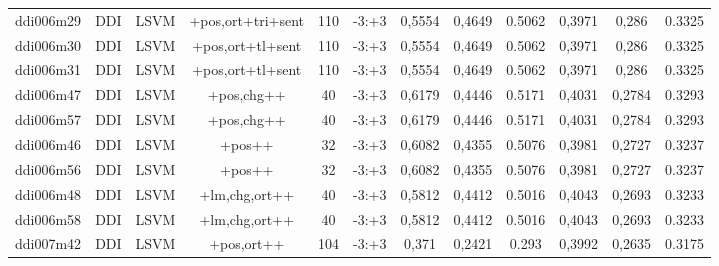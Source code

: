 \documentclass[a4paper]{article}
\begin{document}
\begin{landscape}
\begin{center}
\begin{tabular}{ |c|c|c|c|c|c|c|c|c|c|c|c|}
 
 	
 	\small{ ddi006m29 } & \small{ DDI} & \small{  LSVM }  & +pos,ort+tri+sent  &  110 &  \small{  -3:+3 }  &  0,5554 & 0,4649 & 0.5062  &  0,3971 & 0,286 & 0.3325 \\
 	

 
 	
 	\small{ ddi006m30 } & \small{ DDI} & \small{  LSVM }  & +pos,ort+tl+sent  &  110 &  \small{  -3:+3 }  &  0,5554 & 0,4649 & 0.5062  &  0,3971 & 0,286 & 0.3325 \\
 	

 
 	
 	\small{ ddi006m31 } & \small{ DDI} & \small{  LSVM }  & +pos,ort+tl+sent  &  110 &  \small{  -3:+3 }  &  0,5554 & 0,4649 & 0.5062  &  0,3971 & 0,286 & 0.3325 \\
 	

 
 	
 	\small{ ddi006m47 } & \small{ DDI} & \small{  LSVM }  & +pos,chg++  &  40 &  \small{  -3:+3 }  &  0,6179 & 0,4446 & 0.5171  &  0,4031 & 0,2784 & 0.3293 \\
 	

 
 	
 	\small{ ddi006m57 } & \small{ DDI} & \small{  LSVM }  & +pos,chg++  &  40 &  \small{  -3:+3 }  &  0,6179 & 0,4446 & 0.5171  &  0,4031 & 0,2784 & 0.3293 \\
 	

 
 	
 	\small{ ddi006m46 } & \small{ DDI} & \small{  LSVM }  & +pos++  &  32 &  \small{  -3:+3 }  &  0,6082 & 0,4355 & 0.5076  &  0,3981 & 0,2727 & 0.3237 \\
 	

 
 	
 	\small{ ddi006m56 } & \small{ DDI} & \small{  LSVM }  & +pos++  &  32 &  \small{  -3:+3 }  &  0,6082 & 0,4355 & 0.5076  &  0,3981 & 0,2727 & 0.3237 \\
 	

 
 	
 	\small{ ddi006m48 } & \small{ DDI} & \small{  LSVM }  & +lm,chg,ort++  &  40 &  \small{  -3:+3 }  &  0,5812 & 0,4412 & 0.5016  &  0,4043 & 0,2693 & 0.3233 \\
 	

 
 	
 	\small{ ddi006m58 } & \small{ DDI} & \small{  LSVM }  & +lm,chg,ort++  &  40 &  \small{  -3:+3 }  &  0,5812 & 0,4412 & 0.5016  &  0,4043 & 0,2693 & 0.3233 \\
 	

 
 	
 	\small{ ddi007m42 } & \small{ DDI} & \small{  LSVM }  & +pos,ort++  &  104 &  \small{  -3:+3 }  &  0,371 & 0,2421 & 0.293  &  0,3992 & 0,2635 & 0.3175 \\
 	


\end{tabular}
\end{center}
\end{landscape}
\end{document}
